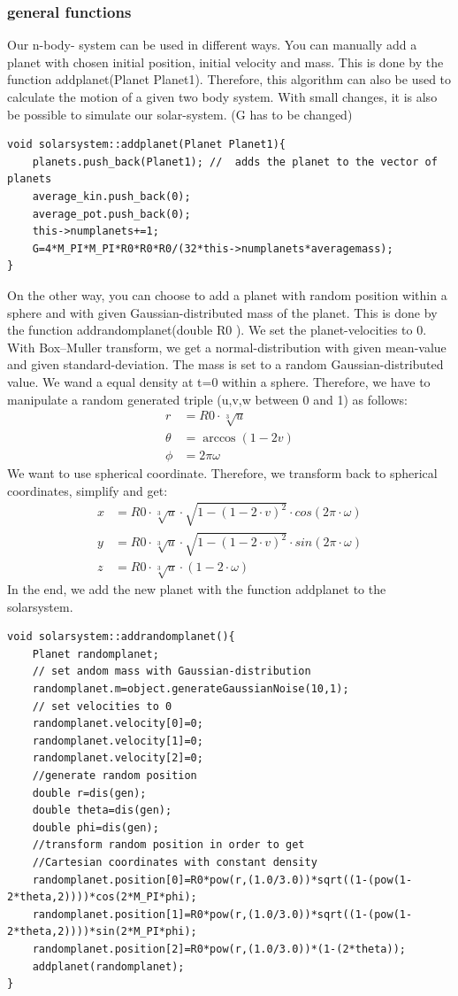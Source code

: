\documentclass[10pt,a4paper]{article}
\begin{document}
\subsubsection{general functions} 
Our n-body- system can be used in different ways. You can manually add a planet with chosen initial position, initial velocity and mass. This is done by the function addplanet(Planet Planet1). Therefore, this algorithm can also be used to calculate the motion of a given two body system. With small changes, it is also be possible to simulate our solar-system. (G has to be changed)
\begin{lstlisting}
void solarsystem::addplanet(Planet Planet1){
    planets.push_back(Planet1); //  adds the planet to the vector of planets
    average_kin.push_back(0);
    average_pot.push_back(0);
    this->numplanets+=1;
    G=4*M_PI*M_PI*R0*R0*R0/(32*this->numplanets*averagemass);
}
\end{lstlisting}
On the other way, you can choose to add a planet with random position within a sphere and with given Gaussian-distributed mass of the planet. This is done by the function addrandomplanet(double R0 ). We set the planet-velocities to 0. With Box–Muller transform, we get a normal-distribution with given mean-value and given standard-deviation. The mass is set to a random Gaussian-distributed value. We wand a equal density at t=0 within a sphere. Therefore, we have to manipulate a random generated triple (u,v,w between 0 and 1) as follows:
\begin{align*}
r &=R0 \cdot \sqrt[3]{u} \\
\theta &= \arccos(1-2v) \\
\phi &= 2 \pi \omega
\end{align*}
We want to use spherical coordinate. Therefore, we transform back to spherical coordinates, simplify and get:
\begin{align*}
x&=R0 \cdot \sqrt[3]{u} \cdot  \sqrt{1-(1-2\cdot v)^{2} }\cdot cos(2\pi \cdot \omega) \\
y&=R0 \cdot \sqrt[3]{u} \cdot  \sqrt{1-(1-2\cdot v)^{2} }\cdot sin(2\pi \cdot \omega) \\
z &= R0 \cdot \sqrt[3]{u} \cdot (1-2 \cdot \omega )
\end{align*}
In the end, we add the new planet with the function addplanet to the solarsystem. 
\begin{lstlisting}
void solarsystem::addrandomplanet(){
    Planet randomplanet;
    // set andom mass with Gaussian-distribution
    randomplanet.m=object.generateGaussianNoise(10,1);
    // set velocities to 0
    randomplanet.velocity[0]=0;
    randomplanet.velocity[1]=0;
    randomplanet.velocity[2]=0;
    //generate random position
    double r=dis(gen);
    double theta=dis(gen);
    double phi=dis(gen);
    //transform random position in order to get
    //Cartesian coordinates with constant density
    randomplanet.position[0]=R0*pow(r,(1.0/3.0))*sqrt((1-(pow(1-2*theta,2))))*cos(2*M_PI*phi);
    randomplanet.position[1]=R0*pow(r,(1.0/3.0))*sqrt((1-(pow(1-2*theta,2))))*sin(2*M_PI*phi);
    randomplanet.position[2]=R0*pow(r,(1.0/3.0))*(1-(2*theta));
    addplanet(randomplanet);
}
\end{lstlisting}
\end{document}
